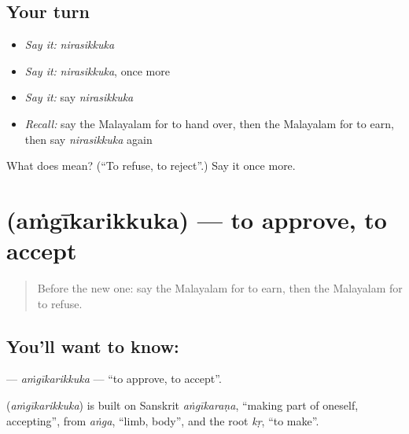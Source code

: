\subsection*{Your turn}
\begin{itemize}
\raggedright
  \item \emph{Say it:} \emph{nirasikkuka}
  \item \emph{Say it:} \emph{nirasikkuka}, once more
  \item \emph{Say it:} say \emph{nirasikkuka}
  \item \emph{Recall:} say the Malayalam for to hand over, then the Malayalam for to earn, then say \emph{nirasikkuka} again
\end{itemize}

\begin{tcolorbox}[breakable,colback=teal!4,colframe=teal!35!black,title={Before you move on}]
What does  mean? (\textquotedblleft{}To refuse, to reject\textquotedblright{}.) Say it once more.
\end{tcolorbox}
\section[\texorpdfstring{\ml{അംഗീകരിക്കുക} (aṁgīkarikkuka)}{അംഗീകരിക്കുക (aṁgīkarikkuka)}]{ (aṁgīkarikkuka) — to approve, to accept}

\label{lesson:ML-C268-amgikarikkuka}



\begin{quote}
Before the new one: say the Malayalam for to earn, then the Malayalam for to refuse.
\end{quote}

\subsection*{You'll want to know: }
\textbf{} — \emph{aṁgīkarikkuka} — \textquotedblleft{}to approve, to accept\textquotedblright{}.

\begin{cousinweb}
\textbf{} (\emph{aṁgīkarikkuka}) is built on Sanskrit \emph{aṅgīkaraṇa}, \textquotedblleft{}making part of oneself, accepting\textquotedblright{}, from \emph{aṅga}, \textquotedblleft{}limb, body\textquotedblright{}, and the root \emph{kṛ}, \textquotedblleft{}to make\textquotedblright{}.
\end{cousinweb}


